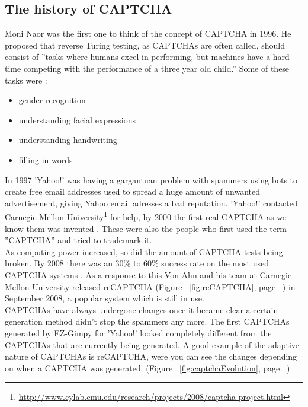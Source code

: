 \documentclass[pdftex,a4paper,12pt,twoside]{report}
\theoremstyle{plain} \newtheorem{theorem}{Theorem} \newtheorem{proposition}{Proposition} \newtheorem{lemma}{Lemma} \newtheorem*{corollary}{Corollary}
\theoremstyle{definition} \newtheorem{definition}{Definition} \newtheorem{conjecture}{Conjecture} \newtheorem*{example}{Example} \newtheorem{algorithm}{Algorithm}
\theoremstyle{remark} \newtheorem*{remark}{Remark} \newtheorem*{note}{Note} \newtheorem{case}{Case}
\begin{document}
\subsection{The history of CAPTCHA}
Moni Naor was the first one to think of the concept of CAPTCHA in 1996. He proposed that reverse Turing testing, as CAPTCHAs are often called, should consist of ''tasks where humans excel in performing, but machines have a hard-time competing with the performance of a three year old child.'' Some of these tasks were \citep{Naor1996}:
\begin{itemize}
\item gender recognition
\item understanding facial expressions
\item understanding handwriting
\item filling in words
\end{itemize}
In 1997 'Yahoo!' was having a gargantuan problem with spammers using bots to create free email addresses used to spread a huge amount of unwanted advertisement, giving Yahoo email adresses a bad reputation. 'Yahoo!' contacted Carnegie Mellon University\footnote{\url{http://www.cylab.cmu.edu/research/projects/2008/captcha-project.html}} for help, by 2000 the first real CAPTCHA as we know them was invented \citep{Egen2009}. These were also the people who first used the term ''CAPTCHA'' and tried to trademark it.\\As computing power increased, so did the amount of CAPTCHA tests being broken. By 2008 there was an 30\% to 60\% success rate on the most used CAPTCHA systems \citep{Yan2008}. As a  response to this Von Ahn and his team at Carnegie Mellon University released reCAPTCHA (Figure ~\ref{fig:reCAPTCHA}, page ~\pageref{fig:reCAPTCHA}) in September 2008, a popular system which is still in use.\\CAPTCHAs have always undergone changes once it became clear a certain generation method didn't stop the spammers any more. The first CAPTCHAs generated by EZ-Gimpy for 'Yahoo!' looked completely different from the CAPTCHAs that are currently being generated. A good example of the adaptive nature of CAPTCHAs is reCAPTCHA, were you can see the changes depending on when a CAPTCHA was generated. (Figure ~\ref{fig:captchaEvolution}, page ~\pageref{fig:captchaEvolution})
\end{document}
